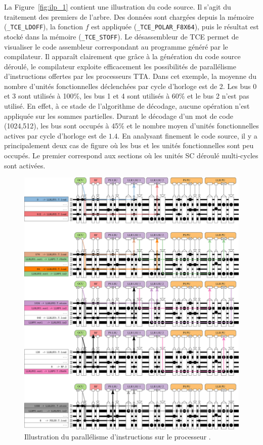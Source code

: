 La Figure~\ref{fig:ilp_1} contient une illustration du code source. Il s'agit du traitement des premiers \noeuds de l'arbre. Des données sont chargées depuis la mémoire (\texttt{\_TCE\_LDOFF}), la fonction $f$ est appliquée (\texttt{\_TCE\_POLAR\_F8X64}), puis le résultat est stocké dans la mémoire (\texttt{\_TCE\_STOFF}). Le désassembleur de TCE permet de visualiser le code assembleur correspondant au programme généré par le compilateur. Il apparaît clairement que grâce à la génération du code source déroulé, le compilateur exploite efficacement les possibilités de parallélisme d'instructions offertes par les processeurs TTA. Dans cet exemple, la moyenne du nombre d'unités fonctionnelles déclenchées par cycle d'horloge est de 2. Les bus 0 et 3 sont utilisés à 100\%, les bus 1 et 4 sont utilisés à 60\% et le bus 2 n'est pas utilisé. En effet, à ce stade de l'algorithme de décodage, aucune opération n'est appliquée sur les sommes partielles. Durant le décodage d'un mot de code (1024,512), les bus sont occupés à 45\% et le nombre moyen d'unités fonctionnelles actives par cycle d'horloge est de $1.4$. En analysant finement le code source, il y a principalement deux cas de figure où les bus et les unités fonctionnelles sont peu occupés. Le premier correspond aux sections où les unités \og SC déroulé \fg multi-cycles sont activées. 
\begin{figure}[htp]
\centering
\includegraphics[width=\textwidth]{main/ch4_fig/ilp_2}
\caption{Illustration du parallélisme d'instructions sur le processeur \TTSC.}
\label{fig:ilp_2}
\end{figure}
